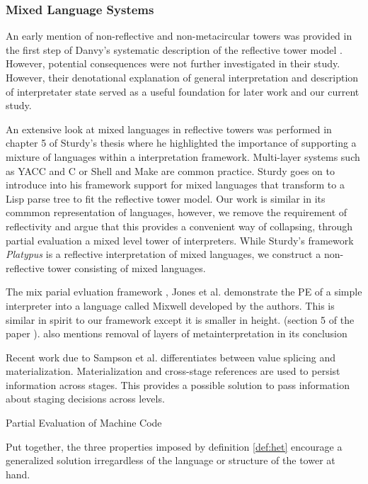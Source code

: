 \documentclass{article}
\theoremstyle{definition}
\begin{document}
\subsubsection{Mixed Language Systems}
An early mention of non-reflective and non-metacircular towers was provided in the first step of Danvy's systematic description of the reflective tower model \cite{danvy1988intensions}. However, potential consequences were not further investigated in their study. However, their denotational explanation of general interpretation and description of interpretater state served as a useful foundation for later work and our current study.

An extensive look at mixed languages in reflective towers was performed in chapter 5 of Sturdy's thesis \cite{sturdy1993lisp} where he highlighted the importance of supporting a mixture of languages within a interpretation framework. Multi-layer systems such as YACC and C or Shell and Make are common practice. Sturdy goes on to introduce into his framework support for mixed languages that transform to a Lisp parse tree to fit the reflective tower model. Our work is similar in its commmon representation of languages, however, we remove the requirement of reflectivity and argue that this provides a convenient way of collapsing, through partial evaluation a mixed level tower of interpreters. While Sturdy's framework \textit{Platypus} is a reflective interpretation of mixed languages, we construct a non-reflective tower consisting of mixed languages.

The mix parial evluation framework \cite{jones1989mix}, Jones et al. demonstrate the PE of a simple interpreter into a language called Mixwell developed by the authors. This is similar in spirit to our framework except it is smaller in height. (section 5 of the paper \cite{jones1989mix}). also mentions removal of layers of metainterpretation in its conclusion

Recent work due to Sampson et al. \cite{sampson2017static} differentiates between value splicing and materialization. Materialization and cross-stage references are used to persist information across stages. This provides a possible solution to pass information about staging decisions across levels.

Partial Evaluation of Machine Code

Put together, the three properties imposed by definition \ref{def:het} encourage a generalized solution irregardless of the language or structure of the tower at hand.
\end{document}
